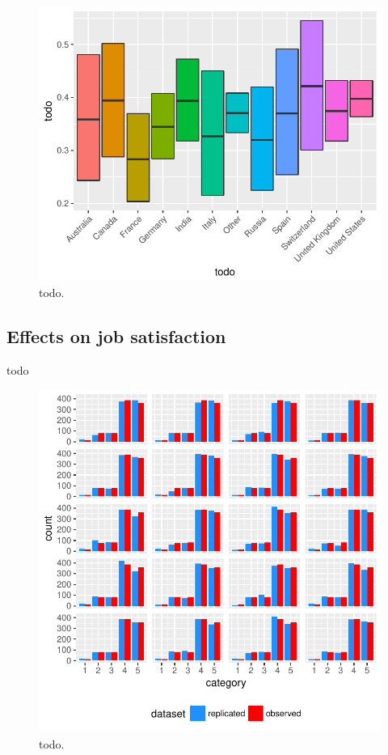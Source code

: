 \documentclass{article}
\begin{document}
\begin{figure}[H]
\centering
\includegraphics{report-012}
\caption{todo.}\label{fig_2}
\end{figure}

\subsection{Effects on job satisfaction}
todo





\begin{figure}[H]
\centering
\includegraphics{report-017}
\caption{todo.}\label{fig_3}
\end{figure}
\end{document}
